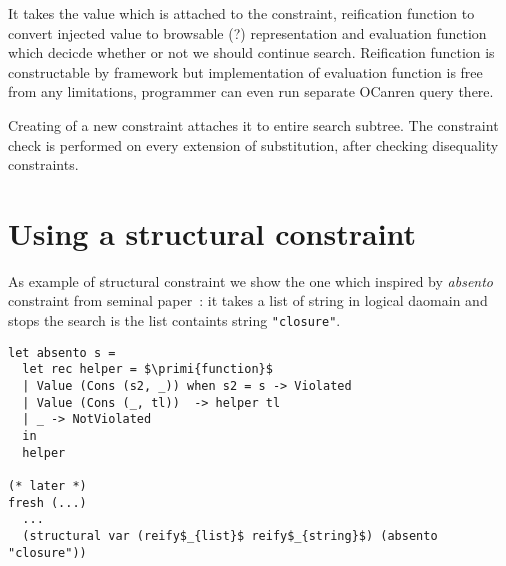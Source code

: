 It takes the value which is attached to the constraint, reification function to convert injected value to browsable (?) representation and evaluation function which decicde whether or not we should continue search. Reification function is constructable by framework but implementation of evaluation function is free from any limitations, programmer can even run separate OCanren query there.

Creating of a new constraint attaches it to entire search subtree. The constraint check is performed on every extension of substitution, after checking disequality constraints.

\section{Using a structural constraint}

As example of structural constraint we show the one which inspired by \emph{absento} constraint from seminal paper~\cite{Untagged}: it takes a list of string in logical daomain and stops the search is the list containts string \texttt{"closure"}.

\begin{lstlisting}
let absento s = 
  let rec helper = $\primi{function}$
  | Value (Cons (s2, _)) when s2 = s -> Violated 
  | Value (Cons (_, tl))  -> helper tl
  | _ -> NotViolated
  in
  helper
  
(* later *)
fresh (...)
  ...
  (structural var (reify$_{list}$ reify$_{string}$) (absento "closure"))
\end{lstlisting}
